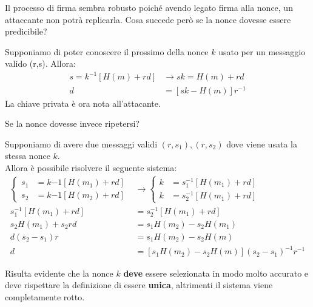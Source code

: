 Il processo di firma sembra robusto poiché avendo legato firma alla nonce, un attaccante non potrà replicarla. Cosa succede però se la nonce dovesse essere predicibile?\pagebreak
\begin{corollary}\label{cor:kpred}
Supponiamo di poter conoscere il prossimo della nonce $k$ usato per un messaggio valido (r,s)\footnotemark. Allora:
\begin{align*}
    s=k^{-1}[H(m)+rd]&\longrightarrow sk=H(m)+rd\\
    d&=[sk-H(m)]r^{-1}
\end{align*}
La chiave privata è ora nota all'attacante.
\end{corollary}
Se la nonce dovesse invece ripetersi?
\begin{corollary}\label{cor:krep}
Supponiamo di avere due messaggi validi $(r,s_1),(r,s_2)$ dove viene usata la stessa nonce $k$.\footnotemark\\
Allora è possibile risolvere il seguente sistema:
\begin{equation*}
\begin{aligned}
    \begin{cases}
    s_1&=k{-1}[H(m_1)+rd]\\
    s_2&=k{-1}[H(m_2)+rd]
    \end{cases}
    &\longrightarrow
    \begin{cases}
    k&=s_1^{-1}[H(m_1)+rd]\\
    k&=s_2^{-1}[H(m_1)+rd]
    \end{cases}\\
    s_1^{-1}[H(m_1)+rd]&=s_2^{-1}[H(m_1)+rd]\\
    s_2H(m_1)+s_2rd&=s_1H(m_2)-s_2H(m_1)\\
d(s_2-s_1)r&=s_1H(m_2)-s_2H(m)\\
d&=[s_1H(m_2)-s_2H(m)](s_2-s_1)^{-1}r^{-1}
    \end{aligned}
\end{equation*}
\end{corollary}
\begin{remark}
Risulta evidente che la nonce $k$ \textbf{deve} essere selezionata in modo molto accurato e deve rispettare la definizione di essere \textbf{unica}, altrimenti il sistema viene completamente rotto.
\end{remark}\pagebreak
